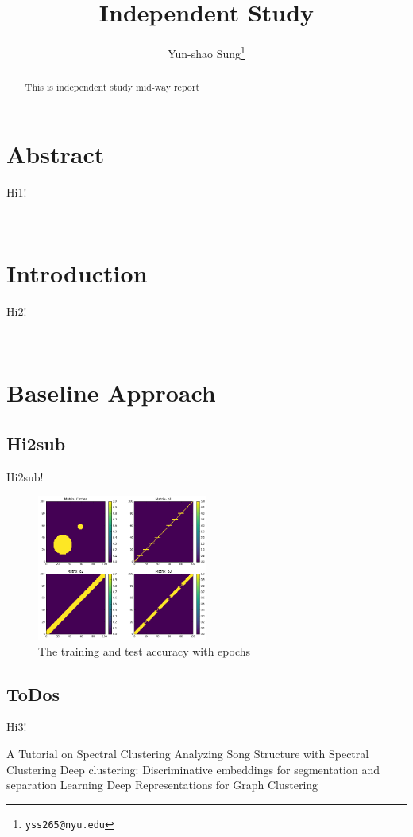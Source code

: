 \documentclass[final]{siamltexmm}
\title{Independent Study}
\author{Yun-shao Sung\thanks{\tt yss265@nyu.edu} }
\begin{document}
\maketitle

\begin{abstract}
This is independent study mid-way report
\end{abstract}

\pagestyle{myheadings}
\thispagestyle{plain}

\section{Abstract}
Hi1!

\\
\section{Introduction}
Hi2!

\\
\section{Baseline Approach}

\subsection{Hi2sub}
Hi2sub!

\begin{figure}[H]
  \centering
    \includegraphics[width=0.5\textwidth]{./figure/similarityMatrix.png}
  \caption{The training and test accuracy with epochs}
\end{figure}


\subsection{ToDos}
Hi3!

\begin{thebibliography}{10}
 {\sc A Tutorial on Spectral Clustering}
 {\sc Analyzing Song Structure with Spectral Clustering}
 {\sc Deep clustering: Discriminative embeddings for
segmentation and separation}
 {\sc Learning Deep Representations for Graph Clustering}

\end{thebibliography}
\end{document}
